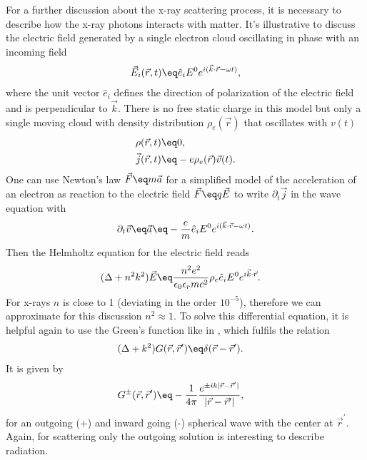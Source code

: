 \documentclass[\main/dresen_thesis.tex]{subfiles}
\begin{document}
For a further discussion about the x-ray scattering process, it is necessary to describe how the x-ray photons interacts with matter.
It's illustrative to discuss the electric field generated by a single electron cloud oscillating in phase with an incoming field
\begin{align}
  \vec{E}_i (\vec{r}, t) \eq \hat{e}_i E^0 e^{i (\vec{k} \cdot \vec{r} - \omega t)},
\end{align}
where the unit vector $\hat{e}_i$ defines the direction of polarization of the electric field and is perpendicular to $\vec{k}$.
There is no free static charge in this model but only a single moving cloud with density distribution $\rho_e(\vec{r})$ that oscillates with $v(t)$
\begin{align}
  \rho (\vec{r}, t) \eq& 0,\\
  \vec{j} (\vec{r}, t) \eq& -e \rho_e(\vec{r}) \vec{v} (t).
\end{align}
One can use Newton's law $\vec{F} \eq m \vec{a}$ for a simplified model of the acceleration of an electron as reaction to the electric field $\vec{F} \eq q \vec{E}$ to write $\partial_t \vec{j}$ in the wave equation with
\begin{align}
  \partial_t \vec{v} \eq \vec{a} \eq -\frac{e}{m} \hat{e}_i E^0 e^{i(\vec{k}\cdot \vec{r} - \omega t)}.
\end{align}
Then the Helmholtz equation for the electric field reads
\begin{align}
  (\Delta + n^2 k^2 )\vec{E} \eq& \frac{n^2 e^2}{\epsilon_0 \epsilon_r m c^2} \rho_e \hat{e}_i E^0 e^{i\vec{k}\cdot \vec{r}}.
\end{align}
For x-rays $n$ is close to 1 (deviating in the order $10^{-5}$), therefore we can approximate for this discussion $n^2 \approx 1$.
To solve this differential equation, it is helpful again to use the Green's function like in , which fulfils the relation
\begin{align}
  (\Delta + k^2) G(\vec{r}, \vec{r}^\prime) \eq& \delta(\vec{r} - \vec{r}^\prime).
\end{align}
It is given by \cite{Jackson_1999_Class}
\begin{align}
  G^{\pm}(\vec{r}, \vec{r}^\prime) \eq& - \frac{1}{4\pi} \frac{e^{\pm i k |\vec{r} - \vec{r}^\prime|}}{|\vec{r} - \vec{r}^\prime|},
\end{align}
for an outgoing (+) and inward going (-) spherical wave with the center at $\vec{r}^\prime$. Again, for scattering only the outgoing solution is interesting to describe radiation.
\end{document}
